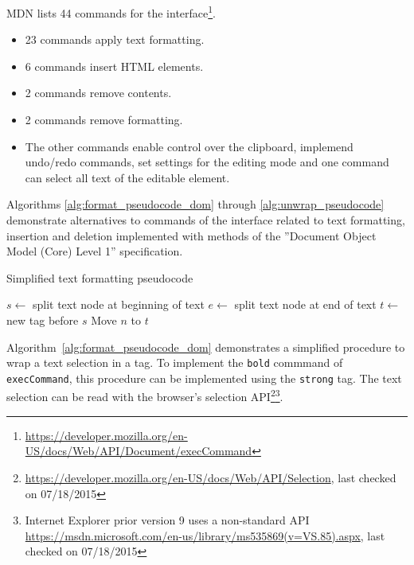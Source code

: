 MDN lists 44 commands for the  interface\footnote{\url{https://developer.mozilla.org/en-US/docs/Web/API/Document/execCommand}}. 

\begin{itemize}
\item 23 commands apply text formatting.
\item 6 commands insert HTML elements.
\item 2 commands remove contents.
\item 2 commands remove formatting.
\item The other commands enable control over the clipboard, implemend undo/redo commands, set settings for the editing mode and one command can select all text of the editable element.
\end{itemize}

Algorithms \ref{alg:format_pseudocode_dom} through \ref{alg:unwrap_pseudocode} demonstrate alternatives to commands of the  interface related to text formatting, insertion and deletion implemented with methods of the ''Document Object Model (Core) Level 1'' specification.


\begin{algorithm}
\caption{Simplified text formatting pseudocode}
\label{alg:format_pseudocode_dom}
\begin{algorithmic}[1]
\State $s \gets$ split text node at beginning of text
\State $e \gets$ split text node at end of text
\State $t \gets$ new tag before $s$
  \State Move $n$ to $t$
\EndFor
\EndProcedure
\end{algorithmic}
\end{algorithm}



Algorithm~\ref{alg:format_pseudocode_dom} demonstrates a simplified procedure to wrap a text selection in a tag. To implement the \texttt{bold} commmand of \texttt{execCommand}, this procedure can be implemented using the \texttt{strong} tag. The text selection can be read with the browser's selection API\footnote{\url{https://developer.mozilla.org/en-US/docs/Web/API/Selection}, last checked on 07/18/2015}\footnote{Internet Explorer prior version 9 uses a non-standard API \url{https://msdn.microsoft.com/en-us/library/ms535869(v=VS.85).aspx}, last checked on 07/18/2015}.

